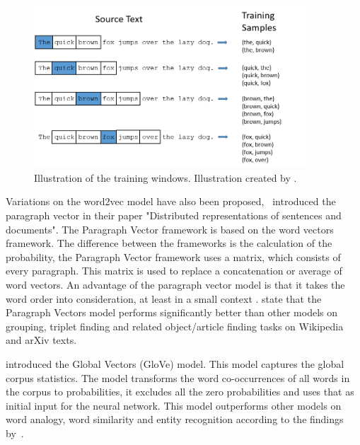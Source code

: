 \documentclass[../../Thesis.tex]{subfiles}
\begin{document}
\begin{jumpin}
\begin{figure}[hbt]
\begin{center}
\end{center}
\end{figure}
\begin{figure}[hbt]
\begin{center}
\includegraphics[width=4in]{Plots/training_window.png}
\caption{Illustration of the training windows. Illustration created by \citet{trainingWindow}.}
\end{center}
\end{figure}
\FloatBarrier
{}
Variations on the word2vec model have also been proposed,~\citet{le2014distributed} introduced the paragraph vector in their paper "Distributed representations of sentences and documents". The Paragraph Vector framework is based on the word vectors framework. The difference between the frameworks is the calculation of the probability, the Paragraph Vector framework uses a matrix, which consists of every paragraph. This matrix is used to replace a concatenation or average of word vectors. An advantage of the paragraph vector model is that it takes the word order into consideration, at least in a small context \cite{le2014distributed}. \citet{dai2015document} state that the Paragraph Vectors model performs significantly better than other models on grouping, triplet finding and related object/article finding tasks on Wikipedia and arXiv texts.

\citet{pennington2014glove} introduced the Global Vectors (GloVe) model. This model captures the global corpus statistics. The model transforms the word co-occurrences of all words in the corpus to probabilities, it excludes all the zero probabilities and uses that as initial input for the neural network. This model outperforms other models on word analogy, word similarity and entity recognition according to the findings by~\citet{pennington2014glove}.\\


\end{jumpin}
\end{document}
